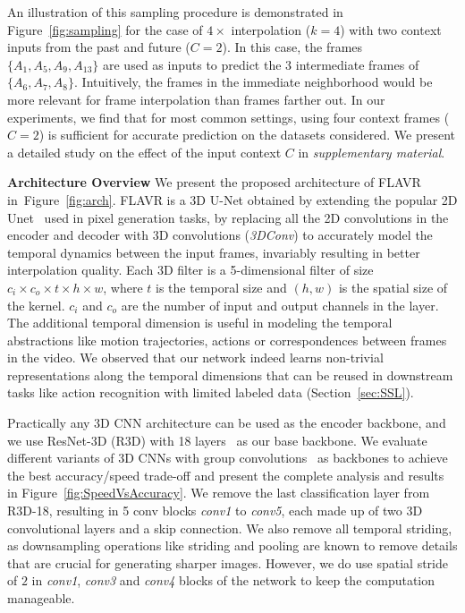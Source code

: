 \documentclass[10pt,twocolumn,letterpaper]{article}
\newcommand{\figref}[1]{Figure~\ref{#1}}
\newcommand{\secref}[1]{Section~\ref{#1}}
\newcommand{\Ours}{FLAVR}
\newcommand{\fourx}{$4\times$}
\newcommand{\stimes}{{\times}}
\begin{document}
An illustration of this sampling procedure is demonstrated in \figref{fig:sampling} for the case of \fourx{} interpolation ($k{=}4$) with two context inputs from the past and future ($C=2$). In this case, the frames $\{A_{1} , A_{5} , A_{9} , A_{13}\}$ are used as inputs to predict the $3$ intermediate frames of $\{A_{6}, A_{7}, A_{8}\}$. Intuitively, the frames in the immediate neighborhood would be more relevant for frame interpolation than frames farther out.
In our experiments, we find that for most common settings, using four context frames ($C=2$) is sufficient for accurate prediction on the datasets considered. 
We present a detailed study on the effect of the input context $C$ in \textit{supplementary material}.

{\bf Architecture Overview} We present the proposed architecture of \Ours{} in~\figref{fig:arch}. \Ours{} is a 3D U-Net obtained by extending the popular 2D Unet~\cite{ronneberger2015u} used in pixel generation tasks, by replacing all the 2D convolutions in the encoder and decoder with 3D convolutions (\textit{3DConv}) to accurately model the temporal dynamics between the input frames, invariably resulting in better interpolation quality. Each 3D filter is a 5-dimensional filter of size $ c_i \stimes c_o \stimes t \stimes h \stimes w $, where $t$ is the temporal size and $(h,w)$ is the spatial size of the kernel. $c_i$ and $c_o$ are the number of input and output channels in the layer. The additional temporal dimension is useful in modeling the temporal abstractions like motion trajectories, actions or correspondences between frames in the video. We observed that our network indeed learns non-trivial representations along the temporal dimensions that can be reused in downstream tasks like action recognition with limited labeled data (\secref{sec:SSL}).

Practically any 3D CNN architecture can be used as the encoder backbone, and we use ResNet-3D (R3D) with 18 layers~\cite{tran2018closer} as our base backbone. We evaluate different variants of 3D CNNs with group convolutions~\cite{Tran19} as backbones to achieve the best accuracy/speed trade-off and present the complete analysis and results in \figref{fig:SpeedVsAccuracy}. We remove the last classification layer from R3D-18, resulting in 5 conv blocks \textit{conv1} to \textit{conv5}, each made up of two 3D convolutional layers and a skip connection.
We also remove all temporal striding, as downsampling operations like striding and pooling are known to remove details that are crucial for generating sharper images. However, we do use spatial stride of $2$ in \textit{conv1}, \textit{conv3} and \textit{conv4} blocks of the network to keep the computation manageable.
\end{document}
